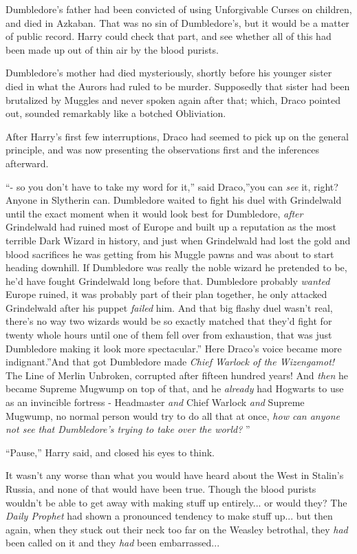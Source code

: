Dumbledore's father had been convicted of using Unforgivable Curses on
children, and died in Azkaban. That was no sin of Dumbledore's, but it
would be a matter of public record. Harry could check that part, and see
whether all of this had been made up out of thin air by the blood
purists.

Dumbledore's mother had died mysteriously, shortly before his younger
sister died in what the Aurors had ruled to be murder. Supposedly that
sister had been brutalized by Muggles and never spoken again after that;
which, Draco pointed out, sounded remarkably like a botched Obliviation.

After Harry's first few interruptions, Draco had seemed to pick up on
the general principle, and was now presenting the observations first and
the inferences afterward.

``- so you don't have to take my word for it,'' said Draco,''you can
\emph{see} it, right? Anyone in Slytherin can. Dumbledore waited to
fight his duel with Grindelwald until the exact moment when it would
look best for Dumbledore, \emph{after} Grindelwald had ruined most of
Europe and built up a reputation as the most terrible Dark Wizard in
history, and just when Grindelwald had lost the gold and blood
sacrifices he was getting from his Muggle pawns and was about to start
heading downhill. If Dumbledore was really the noble wizard he pretended
to be, he'd have fought Grindelwald long before that. Dumbledore
probably \emph{wanted} Europe ruined, it was probably part of their plan
together, he only attacked Grindelwald after his puppet \emph{failed}
him. And that big flashy duel wasn't real, there's no way two wizards
would be so exactly matched that they'd fight for twenty whole hours
until one of them fell over from exhaustion, that was just Dumbledore
making it look more spectacular.'' Here Draco's voice became more
indignant.''And that got Dumbledore made \emph{Chief Warlock of the
Wizengamot!} The Line of Merlin Unbroken, corrupted after fifteen
hundred years! And \emph{then} he became Supreme Mugwump on top of that,
and he \emph{already} had Hogwarts to use as an invincible fortress -
Headmaster \emph{and} Chief Warlock \emph{and} Supreme Mugwump, no
normal person would try to do all that at once, \emph{how can anyone not
see that Dumbledore's trying to take over the world?} ''

``Pause,'' Harry said, and closed his eyes to think.

It wasn't any worse than what you would have heard about the West in
Stalin's Russia, and none of that would have been true. Though the blood
purists wouldn't be able to get away with making stuff up
entirely... or would they? The \emph{Daily Prophet} had shown a
pronounced tendency to make stuff up... but then again, when they
stuck out their neck too far on the Weasley betrothal, they \emph{had}
been called on it and they \emph{had} been embarrassed...

